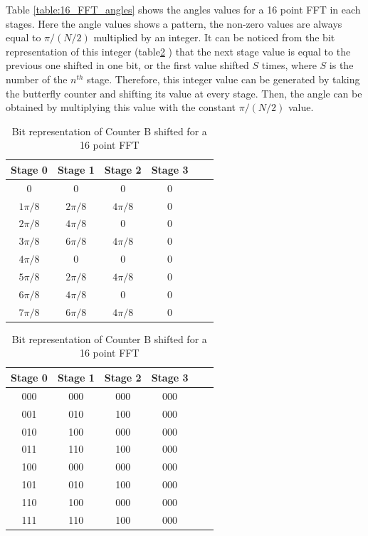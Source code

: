 Table \ref{table:16_FFT_angles} shows the angles values for a 16 point FFT in each stages. Here
the angle values shows a pattern, the non-zero values are always equal to $\pi/(N/2)$ 
multiplied by an integer. It can be noticed from the bit representation of this integer 
(table\ref{table:16_FFT_angles_bin} ) that the next stage value is equal to the previous 
one shifted in one bit, or the first value shifted $S$ times, where $S$ is the number of 
the $n^{th}$ stage. Therefore, this integer value can be generated by taking the butterfly
counter and shifting its value at every stage. Then, the angle can be obtained  by 
multiplying this value with the constant $\pi/(N/2)$ value.


\begin{table}[h]
\parbox{.45\linewidth}{
\centering
\vspace{0.5cm}
\caption{Angle values for a 16 size FFT}
    \label{table:16_FFT_angles}
\begin{tabular}{@{}c c c c c c}
\hline
Stage 0  & Stage 1  & Stage 2  & Stage 3 \\ \hline
0        & 0        & 0        & 0       \\ 
$1\pi/8$ & $2\pi/8$ & $4\pi/8$ & 0       \\ 
$2\pi/8$ & $4\pi/8$ & 0        & 0       \\ 
$3\pi/8$ & $6\pi/8$ & $4\pi/8$ & 0       \\ 
$4\pi/8$ & 0        & 0        & 0       \\ 
$5\pi/8$ & $2\pi/8$ & $4\pi/8$ & 0       \\ 
$6\pi/8$ & $4\pi/8$ & 0        & 0       \\ 
$7\pi/8$ & $6\pi/8$ & $4\pi/8$ & 0       \\ \hline

\end{tabular}

}
\hfill
\parbox{.45\linewidth}{
\centering
\caption{Bit representation of Counter B shifted for a 16 point FFT}
    \label{table:16_FFT_angles_bin}
\begin{tabular}{@{}c c c c c c}
\hline
Stage 0 & Stage 1 & Stage 2 & Stage 3 \\ \hline
000     & 000     & 000     & 000     \\ 
001     & 010     & 100     & 000     \\ 
010     & 100     & 000     & 000     \\
011     & 110     & 100     & 000     \\ 
100     & 000     & 000     & 000     \\ 
101     & 010     & 100     & 000     \\ 
110     & 100     & 000     & 000     \\ 
111     & 110     & 100     & 000     \\ \hline
\end{tabular}
    

}
\end{table}


